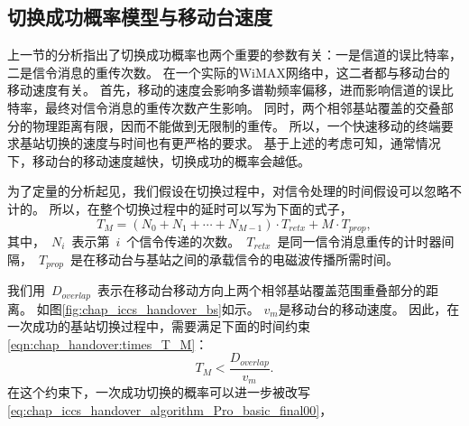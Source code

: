 \subsection{切换成功概率模型与移动台速度}
上一节的分析指出了切换成功概率也两个重要的参数有关：一是信道的误比特率，二是信令消息的重传次数。
在一个实际的WiMAX网络中，这二者都与移动台的移动速度有关。
首先，移动的速度会影响多谱勒频率偏移，进而影响信道的误比特率，最终对信令消息的重传次数产生影响。
同时，两个相邻基站覆盖的交叠部分的物理距离有限，因而不能做到无限制的重传。
所以，一个快速移动的终端要求基站切换的速度与时间也有更严格的要求。
基于上述的考虑可知，通常情况下，移动台的移动速度越快，切换成功的概率会越低。

为了定量的分析起见，我们假设在切换过程中，对信令处理的时间假设可以忽略不计的。
所以，在整个切换过程中的延时可以写为下面的式子，
$$
T_{M}=(N_{0}+N_{1}+\cdots+N_{M-1})\cdot T_{retx}+M\cdot T_{prop},
$$
其中，~$N_i$~表示第~$i$~个信令传递的次数。~$T_{retx}$~是同一信令消息重传的计时器间隔，~$T_{prop}$~是在移动台与基站之间的承载信令的电磁波传播所需时间。

我们用~$D_{overlap}$~表示在移动台移动方向上两个相邻基站覆盖范围重叠部分的距离。
如图\ref{fig:chap_iccs_handover_bs}如示。
$v_m$是移动台的移动速度。
因此，在一次成功的基站切换过程中，需要满足下面的时间约束\eqref{eqn:chap_handover:times_T_M}：
\begin{equation}
T_{M}<\frac{D_{overlap}}{v_{m}}.
\label{eqn:chap_handover:times_T_M}
\end{equation}
在这个约束下，一次成功切换的概率可以进一步被改写\eqref{eq:chap_iccs_handover_algorithm_Pro_basic_final00}，

